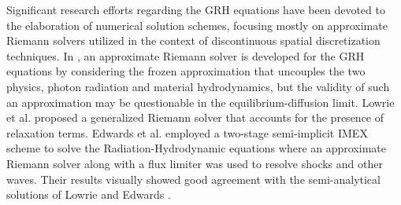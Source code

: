 \documentclass[times,doublespace]{fldauth}%
\begin{document}
%
Significant research efforts regarding the GRH equations have been devoted to the elaboration of numerical solution schemes, focusing mostly on approximate Riemann solvers utilized in the context of discontinuous spatial discretization techniques.
In \cite{Balsara}, an approximate Riemann solver is developed for the GRH equations by considering the frozen approximation that uncouples the two physics, photon radiation and material hydrodynamics, but the validity of such an approximation may be questionable in the equilibrium-diffusion limit.
Lowrie et al. \cite{LowrieMorelHittinger} proposed a generalized Riemann solver that accounts for the presence of relaxation terms.
Edwards et al. \cite{EdwardsMorelLowrie} employed a two-stage semi-implicit IMEX scheme to solve the Radiation-Hydrodynamic equations where an approximate Riemann solver along with a flux limiter was used to resolve shocks and other waves. 
Their results visually showed good agreement with the semi-analytical solutions of Lowrie and Edwards \cite{LowrieEdwards}.
%
%
\end{document}
